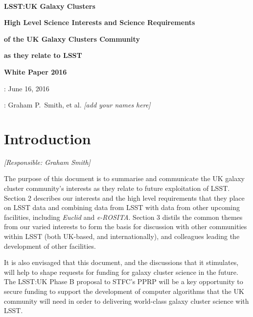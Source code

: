 \documentclass[a4paper,11pt]{article}
\begin{document}
\pagestyle{myheadings}

\sloppy

\pagestyle{empty}

~\vspace{70mm}

\centerline{\LARGE\bf LSST:UK Galaxy Clusters}
\bigskip\bigskip\bigskip
\centerline{\Large\bf High Level Science Interests and Science Requirements}
\medskip
\centerline{\Large\bf of the UK Galaxy Clusters Community}
\medskip
\centerline{\Large\bf as they relate to LSST}
\bigskip\bigskip\bigskip
\centerline{\Large\bf White Paper 2016}

\vspace{90mm}

\large
{}: June 16, 2016

: Graham P.\ Smith, et al. {\it [add your names here]}


\newpage
\pagestyle{myheadings}
\setlength{\topmargin}{-10mm}
\setlength{\textheight}{255mm}

\tableofcontents

\newpage

\section{Introduction}

{\it [Responsible: Graham Smith]}

\noindent
The purpose of this document is to summarise and communicate the UK
galaxy cluster community's interests as they relate to future
exploitation of LSST.  Section 2 describes our interests and the high
level requirements that they place on LSST data and combining data
from LSST with data from other upcoming facilities, including
\emph{Euclid} and \emph{e-ROSITA}.  Section 3 distils the common
themes from our varied interests to form the basis for discussion with
other communities within LSST (both UK-based, and internationally),
and colleagues leading the development of other facilities.

It is also envisaged that this document, and the discussions that it
stimulates, will help to shape requests for funding for galaxy cluster
science in the future.  The LSST:UK Phase B proposal to STFC's PPRP
will be a key opportunity to secure funding to support the development
of computer algorithms that the UK community will need in order to
delivering world-class galaxy cluster science with LSST.
\end{document}

